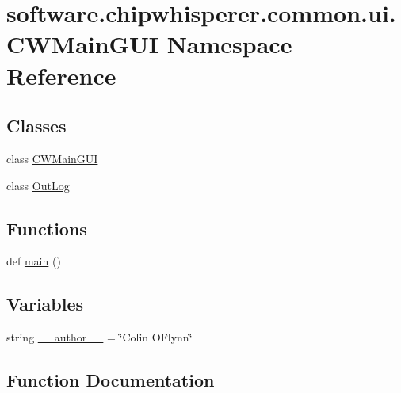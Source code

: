 \hypertarget{namespacesoftware_1_1chipwhisperer_1_1common_1_1ui_1_1CWMainGUI}{}\section{software.\+chipwhisperer.\+common.\+ui.\+C\+W\+Main\+G\+U\+I Namespace Reference}
\label{namespacesoftware_1_1chipwhisperer_1_1common_1_1ui_1_1CWMainGUI}
\subsection*{Classes}
\begin{DoxyCompactItemize}
\item 
class \hyperlink{classsoftware_1_1chipwhisperer_1_1common_1_1ui_1_1CWMainGUI_1_1CWMainGUI}{C\+W\+Main\+G\+U\+I}
\item 
class \hyperlink{classsoftware_1_1chipwhisperer_1_1common_1_1ui_1_1CWMainGUI_1_1OutLog}{Out\+Log}
\end{DoxyCompactItemize}
\subsection*{Functions}
\begin{DoxyCompactItemize}
\item 
def \hyperlink{namespacesoftware_1_1chipwhisperer_1_1common_1_1ui_1_1CWMainGUI_a214d2fef1def9f0ffd19425fedbec7bc}{main} ()
\end{DoxyCompactItemize}
\subsection*{Variables}
\begin{DoxyCompactItemize}
\item 
string \hyperlink{namespacesoftware_1_1chipwhisperer_1_1common_1_1ui_1_1CWMainGUI_a4bc80dfbf79eecc408eb5994cd035354}{\+\_\+\+\_\+author\+\_\+\+\_\+} = \char`\"{}Colin O\textquotesingle{}Flynn\char`\"{}
\end{DoxyCompactItemize}


\subsection{Function Documentation}
\hypertarget{namespacesoftware_1_1chipwhisperer_1_1common_1_1ui_1_1CWMainGUI_a214d2fef1def9f0ffd19425fedbec7bc}{}
